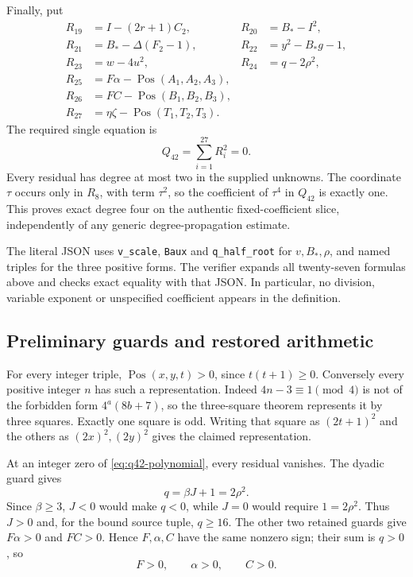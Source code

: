 Finally, put
\begin{align}
 R_{19}&=I-(2r+1)C_2, &
 R_{20}&=B_*-I^2, \nonumber\\
 R_{21}&=B_*-\Delta(F_2-1), &
 R_{22}&=y^2-B_*g-1, \nonumber\\
 R_{23}&=w-4u^2, &
 R_{24}&=q-2\rho^2, \nonumber\\
 R_{25}&=F\alpha-\operatorname{Pos}(A_1,A_2,A_3), &&\nonumber\\
 R_{26}&=FC-\operatorname{Pos}(B_1,B_2,B_3), &&\nonumber\\
 R_{27}&=\eta\zeta-\operatorname{Pos}(T_1,T_2,T_3). &&
 \label{eq:q42-block3}
\end{align}
The required single equation is
\begin{equation}
 \boxed{\displaystyle Q_{42}=\sum_{i=1}^{27}R_i^2=0.}
 \label{eq:q42-polynomial}
\end{equation}
Every residual has degree at most two in the supplied unknowns. The
coordinate $\tau$ occurs only in $R_8$, with term $\tau^2$, so the
coefficient of $\tau^4$ in $Q_{42}$ is exactly one. This proves exact
degree four on the authentic fixed-coefficient slice, independently of
any generic degree-propagation estimate.

The literal JSON uses \texttt{v\_scale}, \texttt{Baux} and
\texttt{q\_half\_root} for $v,B_*,\rho$, and named triples for the three
positive forms. The verifier expands all twenty-seven formulas above
and checks exact equality with that JSON. In particular, no division,
variable exponent or unspecified coefficient appears in the definition.

\subsection{Preliminary guards and restored arithmetic}

For every integer triple, $\operatorname{Pos}(x,y,t)>0$, since
$t(t+1)\ge0$. Conversely every positive integer $n$ has such a
representation. Indeed $4n-3\equiv1\pmod4$ is not of the forbidden form
$4^a(8b+7)$, so the three-square theorem represents it by three squares.
Exactly one square is odd. Writing that square as $(2t+1)^2$ and the
others as $(2x)^2,(2y)^2$ gives the claimed representation.

At an integer zero of \eqref{eq:q42-polynomial}, every residual vanishes.
The dyadic guard gives
\[
 q=\beta J+1=2\rho^2.
\]
Since $\beta\ge3$, $J<0$ would make $q<0$, while $J=0$ would require
$1=2\rho^2$. Thus $J>0$ and, for the bound source tuple, $q\ge16$.
The other two retained guards give $F\alpha>0$ and $FC>0$. Hence
$F,\alpha,C$ have the same nonzero sign; their sum is $q>0$, so
\begin{equation}
 F>0,\qquad \alpha>0,\qquad C>0.
 \label{eq:q42-simplex}
\end{equation}

